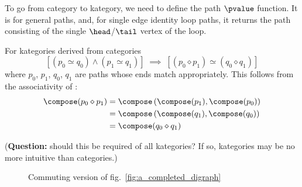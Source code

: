 \documentclass[11pt]{book}
\begin{document}
To go from category to kategory, we need to define the 
path $\pvalue$ function.
It is \compose for general paths, and, 
for single edge identity loop paths,
it returns the 
path consisting of the single 
$\head$/$\tail$ vertex of the loop.

For kategories derived from categories
\begin{equation*}
\left[ \left( p_0 \simeq q_0 \right) \wedge 
 \left( p_1 \simeq q_1  \right) \right]
\; \implies \; 
\left[
\left( p_0 \diamond p_1 \right)
\simeq
\left( q_0 \diamond q_1 \right)
\right]
\end{equation*}
where $p_0$, $p_1$, $q_0$, $q_1$ are paths 
whose ends match appropriately.
This follows from the associativity of \compose:
\begin{align*}
\compose(p_0 \diamond p_1) 
& = 
\compose \left( 
\compose(p_1),
\compose(p_0) \right)
\\
& = 
\compose \left( 
\compose(q_1),
\compose(q_0) \right)
\\
& = 
\compose(q_0 \diamond q_1) 
\end{align*}
 
(\textbf{Question:} should this be required of all kategories?
If so, kategories may be no more intuitive than categories.)
 

\label{sec:Commuting_diagrams}

\begin{figure}
\centering
{}
\caption{Commuting version of fig.~\ref{fig:a_completed_digraph}}
\label{fig:a_commuting_diagram}
\end{figure}
\end{document}
